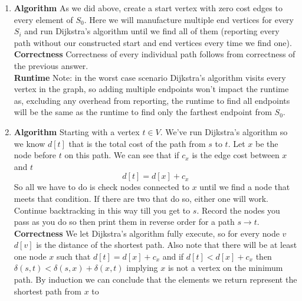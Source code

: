 \documentclass[11pt]{article}
\begin{document}
\begin{enumerate}
{                reluctantly start climbing it once we are out of other
                options.}\\
                From here correctness from Dijkstra's algorithm ensure that we
                will eventually find the most efficient path.\\
		\textbf{Runtime}
                The runtime here is simply the runtime of Dijkstra's
                algorithm, plus the linear time construction of the graph.
                $$O(m + n\log{n}) + O(n) = O(m + n\log{n})$$.\\
		\item 
		\textbf{Algorithm}
		As we did above, create a start vertex with zero cost edges to
		every element of $S_0$. Here we will manufacture
		multiple end vertices for every $S_i$ and run Dijkstra's algorithm
		until we find all of them (reporting every path without our
		constructed start and end vertices every time we find one).\\
		\textbf{Correctness} 
		Correctness of every individual path follows from correctness of
		the previous answer. \\
		\textbf{Runtime}
		Note: in the worst case scenario Dijkstra's algorithm visits every
		vertex in the graph, so adding multiple endpoints won't impact
		the runtime as, excluding any overhead from reporting, the runtime
		to find all endpoints will be the same as the runtime to find
		only the farthest endpoint from $S_0$.
		\item  
		\textbf{Algorithm} Starting with a vertex $t \in V$. We've run
		Dijkstra's algorithm so we know $d[t]$ that is the total
		cost of the path from $s$ to $t$. Let $x$ be the node before $t$
		on this path. We can see that if $c_x$ is the edge cost between $x$
		and $t$
		$$d[t] = d[x] + c_x$$
		So all we have to do is check nodes connected to $x$ until we
		find a node that meets that condition. If there are two that do
		so, either one will work. Continue backtracking in this
		way till you get to $s$. Record the nodes you pass as you do so
		then print them in reverse order for a path $s \rightarrow t$.\\
		\textbf{Correctness}
		 We let Dijkstra's algorithm fully execute, so for every node $v$
		 $d[v]$ is the distance of the shortest path. Also note that there
		 will be at least one node $x$ such that $d[t] = d[x] + c_x$ and
		 if
		$d[t] < d[x] + c_x$  then $\delta(s,t) <  \delta(s,x) +
		\delta(x,t)$ implying $x$ is not a vertex on the minimum path.
		By induction we can conclude that
		the elements we return represent the shortest path from $x$ to

\end{enumerate}
\end{document}
